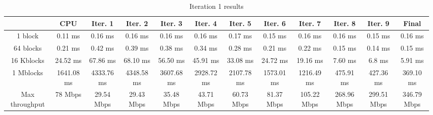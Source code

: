 \begin{table}
	\caption{Iteration 1 results}
	\centering
	\begin{tabular}{cccccccccccc}
		\toprule
		 & CPU & Iter. 1 & Iter. 2 & Iter. 3 & Iter. 4 & Iter. 5 & Iter. 6 & Iter. 7 & Iter. 8 & Iter. 9 & Final \\
		\midrule
		1 block & 0.11 ms & 0.16 ms & 0.16 ms & 0.16 ms & 0.16 ms & 0.17 ms & 0.15 ms & 0.16 ms & 0.16 ms & 0.15 ms & 0.16 ms \\
		64 blocks & 0.21 ms & 0.42 ms & 0.39 ms & 0.38 ms & 0.34 ms & 0.28 ms & 0.21 ms & 0.22 ms & 0.15 ms & 0.14 ms & 0.15 ms \\
		16 Kblocks & 24.52 ms & 67.86 ms & 68.10 ms & 56.50 ms & 45.91 ms & 33.08 ms & 24.72 ms & 19.16 ms & 7.60 ms & 6.8 ms & 5.91 ms \\
		1 Mblocks & 1641.08 ms & 4333.76 ms & 4348.58 ms & 3607.68 ms & 2928.72 ms & 2107.78 ms & 1573.01 ms & 1216.49 ms & 475.91 ms & 427.36 ms & 369.10 ms \\
		Max throughput & 78 Mbps & 29.54 Mbps & 29.43 Mbps & 35.48 Mbps & 43.71 Mbps & 60.73 Mbps & 81.37 Mbps & 105.22 Mbps & 268.96 Mbps & 299.51 Mbps & 346.79 Mbps \\
		\bottomrule
	\end{tabular}
\end{table}
